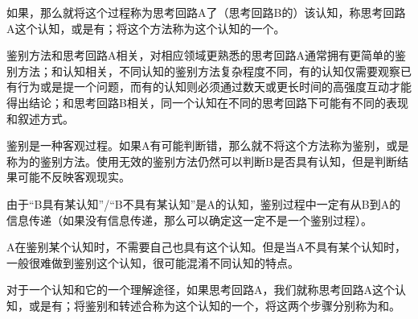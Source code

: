 如果，那么就将这个过程称为思考回路A了（思考回路B的）该认知，称思考回路A这个认知，或是有；将这个方法称为这个认知的一个。
\begin{explain}
鉴别方法和思考回路A相关，对相应领域更熟悉的思考回路A通常拥有更简单的鉴别方法；和认知相关，不同认知的鉴别方法复杂程度不同，有的认知仅需要观察已有行为或是提一个问题，而有的认知则必须通过数天或更长时间的高强度互动才能得出结论；和思考回路B相关，同一个认知在不同的思考回路下可能有不同的表现和叙述方式。

鉴别是一种客观过程。如果A有可能判断错，那么就不将这个方法称为鉴别，或是称为的鉴别方法。使用无效的鉴别方法仍然可以判断B是否具有认知，但是判断结果可能不反映客观现实。

由于“B具有某认知”/“B不具有某认知”是A的认知，鉴别过程中一定有从B到A的信息传递（如果没有信息传递，那么可以确定这一定不是一个鉴别过程）。

A在鉴别某个认知时，不需要自己也具有这个认知。但是当A不具有某个认知时，一般很难做到鉴别这个认知，很可能混淆不同认知的特点。
\end{explain}
对于一个认知和它的一个理解途径，如果思考回路A，我们就称思考回路A这个认知，或是有；将鉴别和转述合称为这个认知的一个，将这两个步骤分别称为和。

